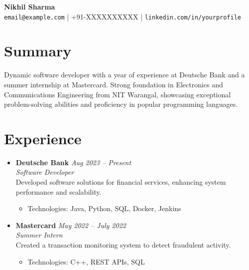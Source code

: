 \documentclass[a4paper,10pt]{article}
\newcommand{\companylogo}[2]{\raisebox{-0.3\height}{\texttt{[image: \#1]}}}
\begin{document}
\begin{center}
    {\Huge \textbf{Nikhil Sharma}} \\
    \small \texttt{email@example.com} \hspace{1.5em} | \hspace{1.5em} +91-XXXXXXXXXX \hspace{1.5em} | \hspace{1.5em} \texttt{linkedin.com/in/yourprofile}
\end{center}

\vspace{0.5em} %

\section*{Summary}
Dynamic software developer with a year of experience at Deutsche Bank and a summer internship at Mastercard. Strong foundation in Electronics and Communications Engineering from NIT Warangal, showcasing exceptional problem-solving abilities and proficiency in popular programming languages.

\vspace{0.5em} %

\section*{Experience}
\begin{itemize}[leftmargin=0.3in, itemsep=4pt, topsep=4pt]
    \item
    \textbf{\companylogo{deutschebank-logo.png}{0.6cm} Deutsche Bank} \hfill \textit{Aug 2023 – Present} \\
    \textit{Software Developer} \\
    Developed software solutions for financial services, enhancing system performance and scalability.
    \begin{itemize}[leftmargin=*]
        \item Technologies: Java, Python, SQL, Docker, Jenkins
    \end{itemize}

    \item
    \textbf{\companylogo{mastercard-logo.png}{0.6cm} Mastercard} \hfill \textit{May 2022 – July 2022} \\
    \textit{Summer Intern} \\
    Created a transaction monitoring system to detect fraudulent activity.
    \begin{itemize}[leftmargin=*]
        \item Technologies: C++, REST APIs, SQL
    \end{itemize}
\end{itemize}
\end{document}
